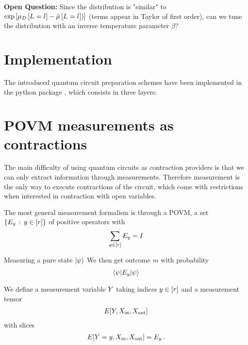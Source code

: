 \documentclass[aps,onecolumn,nofootinbib,pra]{article}
\begin{document}
    \textbf{Open Question:} Since the distribution is "similar" to $\mathrm{exp}\left[\mu_{D}\left[L_{}=l_{}\right]-\tilde{\mu}\left[L_{}=l_{}\right])\right]$ (terms appear in Taylor of first order), can we tune the distribution with an inverse temperature parameter $\beta$?


    \section{Implementation}

    The introduced quantum circuit preparation schemes have been implemented in the python package \qcreason{}, which consists in three layers:
    \begin{center}
        
    \end{center}


    \section{POVM measurements as contractions}

    The main difficulty of using quantum circuits as contraction providers is that we can only extract information through measurements.
    Therefore measurement is the only way to execute contractions of the circuit, which come with restrictions when interested in contraction with open variables.

    The most general measurement formalism is through a POVM, a set $\{E_y \, : \, y\in[r]\}$ of positive operators with %
    \begin{align*}
        \sum_{y\in[r]} E_y = I
    \end{align*}

    Measuring a pure state $\ket{\psi}$ We then get outcome $m$ with probability
    \begin{align*}
        \braket{\psi|E_y|\psi}
    \end{align*}

    We define a measurement variable $Y$ taking indices $y\in[r]$ and a measurement tensor
    \begin{align*}
        E[Y,X_{\mathrm{in}},X_{\mathrm{out}}]
    \end{align*}
    with slices
    \begin{align*}
        E[Y=y,X_{\mathrm{in}},X_{\mathrm{out}}] = E_y \, .
    \end{align*}
\end{document}
